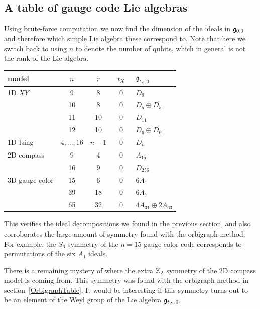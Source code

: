 \documentclass[12pt]{article}
\begin{document}
\subsection{A table of gauge code Lie algebras}

Using brute-force computation
we now find the dimension of the ideals in $\mathfrak{g}_{0,0}$
and therefore which simple Lie algebra these correspond to.
Note that here we switch back to
using $n$ to denote the number of qubits,
which in general is not the rank of the Lie algebra.
\begin{center}
\begin{tabular}{ l|c|c|c|l } 
model &\ $n$\ &\ $r$\ &\ $t_X$\ & $\mathfrak{g}_{t_X,0}$   \\
\hline
     1D $XY$  &  9 &  8 & 0 & $D_9$   \\
             & 10 &  8 & 0 & $D_5\oplus D_5$   \\
             & 11 &  10 & 0 & $D_{11}$   \\
             & 12 &  10 & 0 & $D_6\oplus D_6$   \\
\hline
    1D Ising & $4,...,16$  & $n-1$  & 0  & $D_n$   \\
\hline
    2D compass & 9 & 4 & 0 &  $A_{15}$  \\
            & 16 & 9 & 0 & $D_{256}$ \\
\hline
    3D gauge color & 15 & 6  & 0 & $6A_1$  \\
                & 39 & 18 & 0 & $6A_{7}$ \\
                & 65 & 32 & 0 & $4A_{31}\oplus 2A_{63} $  \\
\end{tabular}
\end{center}

This verifies the ideal decompositions we found in the
previous section, and also corroborates the large
amount of symmetry found with the orbigraph method.
For example, the $S_6$ symmetry of
the $n=15$ gauge color code corresponds to
permutations of the six $A_1$ ideals.

There is a remaining mystery of where
the extra $\mathbb{Z}_2$ symmetry of the 2D compass model is coming from.
This symmetry was found with the orbigraph method in section~\ref{OrbigraphTable}.
It would be interesting if this symmetry turns out to be an element
of the Weyl group of the Lie algebra $\mathfrak{g}_{t_X,0}.$
\end{document}
